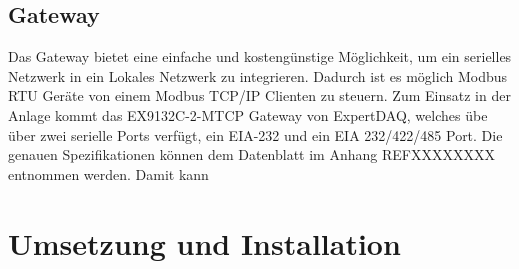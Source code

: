 \subsection{Gateway}
Das Gateway bietet eine einfache und kostengünstige Möglichkeit, um ein serielles Netzwerk in ein Lokales Netzwerk zu integrieren. Dadurch ist es möglich Modbus RTU Geräte von einem Modbus TCP/IP Clienten zu steuern. Zum Einsatz in der Anlage kommt das EX9132C-2-MTCP Gateway von ExpertDAQ, welches übe über zwei serielle Ports verfügt, ein EIA-232 und ein EIA 232/422/485 Port. Die genauen Spezifikationen können dem Datenblatt im Anhang REFXXXXXXXX entnommen werden. Damit kann 

\section{Umsetzung und Installation}



